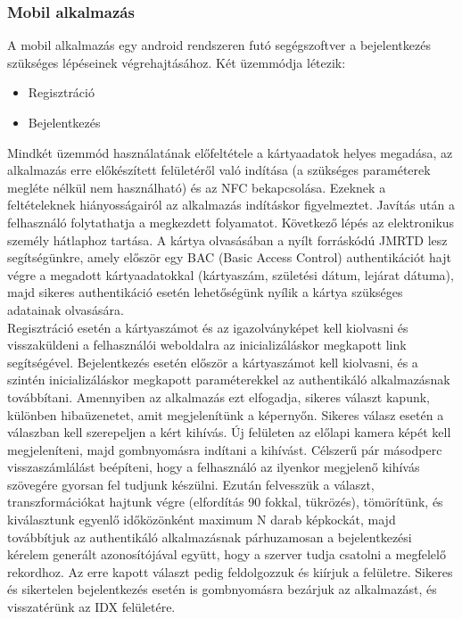 \subsubsection{Mobil alkalmazás}
A mobil alkalmazás egy android rendszeren futó segégszoftver a bejelentkezés szükséges lépéseinek végrehajtásához. Két üzemmódja létezik:
\begin{itemize}
\item Regisztráció
\item Bejelentkezés
\end{itemize}

Mindkét üzemmód használatának előfeltétele a kártyaadatok helyes megadása, az alkalmazás erre előkészített felületéről való indítása (a szükséges paraméterek megléte nélkül nem használható) és az NFC bekapcsolása. Ezeknek a feltételeknek hiányosságairól az alkalmazás indításkor figyelmeztet. Javítás után a felhasználó folytathatja a megkezdett folyamatot. Következő lépés az elektronikus személy hátlaphoz tartása. A kártya olvasásában a nyílt forráskódú JMRTD lesz segítségünkre, amely először egy BAC (Basic Access Control) authentikációt hajt végre a megadott kártyaadatokkal (kártyaszám, születési dátum, lejárat dátuma), majd sikeres authentikáció esetén lehetőségünk nyílik a kártya szükséges adatainak olvasására.
\\Regisztráció esetén a kártyaszámot és az igazolványképet kell kiolvasni és visszaküldeni a felhasználói weboldalra az inicializáláskor megkapott link segítségével.
Bejelentkezés esetén először a kártyaszámot kell kiolvasni, és a szintén inicializáláskor megkapott paraméterekkel az authentikáló alkalmazásnak továbbítani. Amennyiben az alkalmazás ezt elfogadja, sikeres választ kapunk, különben hibaüzenetet, amit megjelenítünk a képernyőn. Sikeres válasz esetén a válaszban kell szerepeljen a kért kihívás. Új felületen az előlapi kamera képét kell megjeleníteni, majd gombnyomásra indítani a kihívást. Célszerű pár másodperc visszaszámlálást beépíteni, hogy a felhasználó az ilyenkor megjelenő kihívás szövegére gyorsan fel tudjunk készülni. Ezután felvesszük a választ, transzformációkat hajtunk végre (elfordítás 90 fokkal, tükrözés), tömörítünk, és kiválasztunk egyenlő időközönként maximum N darab képkockát, majd továbbítjuk az authentikáló alkalmazásnak párhuzamosan a bejelentkezési kérelem generált azonosítójával együtt, hogy a szerver tudja csatolni a megfelelő rekordhoz. Az erre kapott választ pedig feldolgozzuk és kiírjuk a felületre. Sikeres és sikertelen bejelentkezés esetén is gombnyomásra bezárjuk az alkalmazást, és visszatérünk az IDX felületére.


